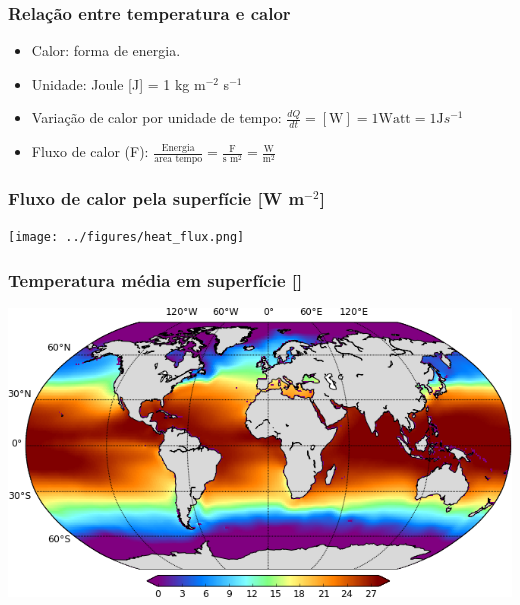 \begin{frame}
\frametitle{Relação entre temperatura e calor}
    \small{
    \begin{itemize}[<+-| alert@+>]
    \item Calor: forma de energia.
    \item Unidade: Joule [J] = 1 kg m$^{-2}$ s$^{-1}$
    \item Variação de calor por unidade de tempo:
        $\frac{dQ}{dt} = [\text{W}] = 1 \text{Watt} = 1 \text{J} s^{-1}$
    \item Fluxo de calor (F):
        $\frac{\text{Energia}}{\text{area tempo}} = \frac{\text{F}}{\text{s m}^{2}} = \frac{\text{W}}{\text{m}^2}$
    \end{itemize}
    }
\end{frame}

\begin{frame}
\frametitle{Fluxo de calor pela superfície [W m$^{-2}$]}
    \begin{center}
        \texttt{[image: ../figures/heat\_flux.png]}
    \end{center}
\end{frame}

\begin{frame}
\frametitle{Temperatura média em superfície [\textcelsius{}]}
    \begin{center}
        \includegraphics[scale=0.5]{./figures/surface_temperature_woa09.png}
    \end{center}
\end{frame}

